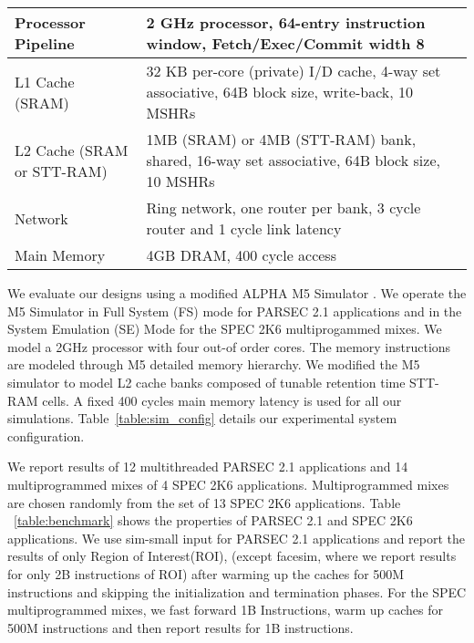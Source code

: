 \begin {table*} [t]
 \scriptsize
  \centering
 \caption {{Baseline processor, cache, memory and network configuration}} \label{table:sim_config}
 \begin{tabular}{|l|l|}
 \hline
Processor Pipeline & 2 GHz processor, 64-entry instruction window, Fetch/Exec/Commit width 8 \\
\hline
L1 Cache (SRAM) & 32 KB per-core (private) I/D cache, 4-way set associative, 64B block size, write-back, 10 MSHRs \\
\hline
L2 Cache (SRAM or STT-RAM) &  1MB (SRAM) or 4MB (STT-RAM) bank, shared, 16-way set associative, 64B block size, 10 MSHRs \\
\hline
Network & Ring network, one router per bank, 3 cycle router and 1 cycle link latency \\
\hline
Main Memory & 4GB DRAM, 400 cycle access \\
\hline
\end{tabular}
\end{table*}

We evaluate our designs using a modified ALPHA M5 Simulator \cite{M5} .
We operate the M5 Simulator in Full System (FS) mode for PARSEC 2.1 applications and in the System Emulation (SE) Mode
for the SPEC 2K6 multiprogammed mixes. We model a 2GHz processor with four out-of order cores.
The memory instructions are modeled through M5 detailed memory hierarchy. We modified the M5 simulator to model
L2 cache banks composed of tunable retention time STT-RAM cells. A fixed 400 cycles main memory latency is used for all our simulations. Table~\ref{table:sim_config} details our experimental system configuration.

We report results of 12 multithreaded PARSEC 2.1 applications and 14 multiprogrammed mixes of 4 SPEC 2K6 applications.
Multiprogrammed mixes are chosen randomly from the set of 13 SPEC 2K6 applications.
Table ~\ref{table:benchmark} shows the properties of PARSEC 2.1 and SPEC 2K6 applications.
We use sim-small input for PARSEC 2.1 applications and report the results of only Region of Interest(ROI), (except facesim, where we report results for only 2B instructions of ROI)
after warming up the caches for 500M instructions and skipping the initialization and termination phases. For the SPEC multiprogrammed mixes,
we fast forward 1B Instructions, warm up caches for 500M instructions and then report
results for 1B instructions.

